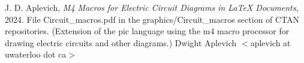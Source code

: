 J. D. Aplevich,
{\it M4 Macros for Electric Circuit Diagrams in LaTeX Documents,}
2024.
File Circuit\_macros.pdf in the graphics/Circuit\_macros section
of CTAN repositories.
(Extension of the pic
language using the m4 macro processor for drawing electric circuits
and other diagrams.)
%
    Dwight Aplevich $<$aplevich at uwaterloo dot ca$>$
%
%
